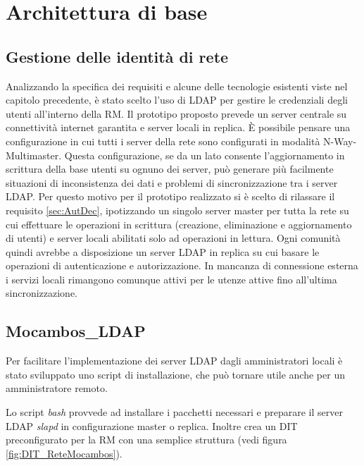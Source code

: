 \section{Architettura di base}

\subsection{Gestione delle identità di rete}
Analizzando la specifica dei requisiti e alcune delle tecnologie
esistenti viste nel capitolo precedente, è stato scelto l'uso di LDAP
per gestire le credenziali degli utenti all'interno della RM. Il
prototipo proposto prevede un server centrale su connettività internet
garantita e server locali in replica. È possibile pensare una
configurazione in cui tutti i server della rete sono configurati in
modalità N-Way-Multimaster. Questa configurazione, se da un lato
consente l'aggiornamento in scrittura della base utenti su ognuno dei
server, può generare più facilmente situazioni di inconsistenza dei
dati e problemi di sincronizzazione tra i server LDAP. Per questo
motivo per il prototipo realizzato si è scelto di rilassare il
requisito \ref{sec:AutDec}, ipotizzando un singolo server master per
tutta la rete su cui effettuare le operazioni in scrittura (creazione,
eliminazione e aggiornamento di utenti) e server locali abilitati solo
ad operazioni in lettura. Ogni comunità quindi avrebbe a disposizione
un server LDAP in replica su cui basare le operazioni di
autenticazione e autorizzazione. In mancanza di connessione esterna i
servizi locali rimangono comunque attivi per le utenze attive fino
all'ultima sincronizzazione.


\subsection{Mocambos\_LDAP}\label{MocambosLDAP}

Per facilitare l'implementazione dei server LDAP dagli amministratori
locali è stato sviluppato uno script di installazione, che può tornare
utile anche per un amministratore remoto.

Lo script \textit{bash} provvede ad installare i pacchetti necessari e
preparare il server LDAP \emph{slapd} in configurazione master o
replica. Inoltre crea un DIT preconfigurato per la RM con una semplice
struttura (vedi figura \ref{fig:DIT_ReteMocambos}).


